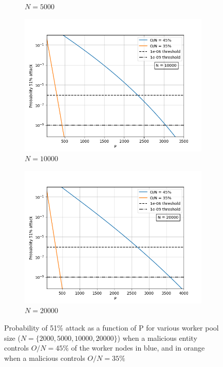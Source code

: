 \begin{figure}[H]
\begin{subfigure}[b]{0.45\textwidth}
        \renewcommand{\thesubfigure}{b}
        \caption{$N = 5000$}
        \label{fig:N5000}
    \end{subfigure}
        \begin{subfigure}[b]{0.45\textwidth}
        \includegraphics[width=\textwidth]{Figures/Prob51_vs_P_N10000_O35_to_45}
   
        \renewcommand{\thesubfigure}{c}
        \caption{$N = 10000$}
        \label{fig:N10000}
    \end{subfigure}
        \begin{subfigure}[b]{0.45\textwidth}
        \includegraphics[width=\textwidth]{Figures/Prob51_vs_P_N20000_O35_to_45}
   
        \renewcommand{\thesubfigure}{d}
        \caption{$N = 20000$}
        \label{fig:N=20000}
    \end{subfigure}
\caption{Probability of 51\% attack as a function of P for various worker pool size ($N=\{2000, 5000, 10000, 20000\}$) when a malicious entity controls $O/N = 45\%$ of the worker nodes in blue, and in orange when a malicious controls $O/N = 35\%$}\label{fig:P}
\end{figure}    

